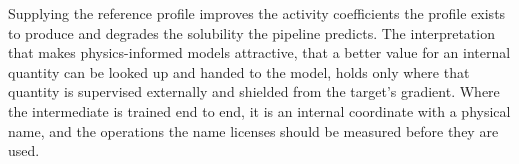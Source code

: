 Supplying the reference profile improves the activity coefficients the profile exists to produce
and degrades the solubility the pipeline predicts. The interpretation that makes physics-informed
models attractive, that a better value for an internal quantity can be looked up and handed to the
model, holds only where that quantity is supervised externally and shielded from the target's
gradient. Where the intermediate is trained end to end, it is an internal coordinate with a
physical name, and the operations the name licenses should be measured before they are used.
